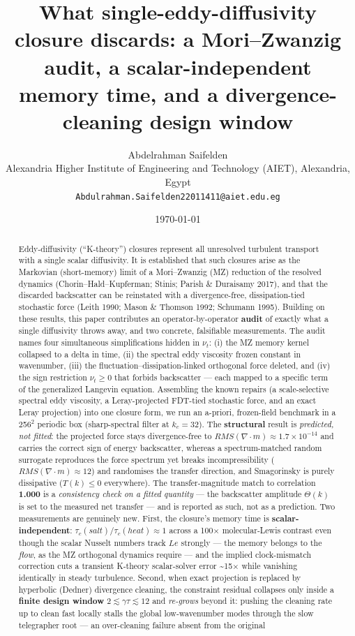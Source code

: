 \documentclass[11pt]{article}
\title{What single-eddy-diffusivity closure discards: a Mori–Zwanzig audit, a scalar-independent memory time, and a divergence-cleaning design window}
\author{Abdelrahman Saifelden\\ Alexandria Higher Institute of Engineering and Technology (AIET), Alexandria, Egypt\\ \texttt{Abdulrahman.Saifelden22011411@aiet.edu.eg}}
\date{\today}
\begin{document}
\maketitle

\begin{abstract}


Eddy-diffusivity (``K-theory'') closures represent all unresolved turbulent transport with a single scalar diffusivity. It is established that such closures arise as the Markovian (short-memory) limit of a Mori–Zwanzig (MZ) reduction of the resolved dynamics (Chorin–Hald–Kupferman; Stinis; Parish \& Duraisamy 2017), and that the discarded backscatter can be reinstated with a divergence-free, dissipation-tied stochastic force (Leith 1990; Mason \& Thomson 1992; Schumann 1995). Building on these results, this paper contributes an operator-by-operator \textbf{audit} of exactly what a single diffusivity throws away, and two concrete, falsifiable measurements. The audit names four simultaneous simplifications hidden in $\nu _{t}$: (i) the MZ memory kernel collapsed to a delta in time, (ii) the spectral eddy viscosity frozen constant in wavenumber, (iii) the fluctuation–dissipation-linked orthogonal force deleted, and (iv) the sign restriction $\nu _{t}\ge 0$ that forbids backscatter — each mapped to a specific term of the generalized Langevin equation. Assembling the known repairs (a scale-selective spectral eddy viscosity, a Leray-projected FDT-tied stochastic force, and an exact Leray projection) into one closure form, we run an a-priori, frozen-field benchmark in a 256\ensuremath{^{2}} periodic box (sharp-spectral filter at $k_{c}=32$). The \textbf{structural} result is \emph{predicted, not fitted}: the projected force stays divergence-free to $RMS(\nabla \cdot m)\approx 1.7\times 10^{-14}$ and carries the correct sign of energy backscatter, whereas a spectrum-matched random surrogate reproduces the force spectrum yet breaks incompressibility ($RMS(\nabla \cdot m)\approx 12$) and randomises the transfer direction, and Smagorinsky is purely dissipative ($T(k)\le 0$ everywhere). The transfer-magnitude match to correlation \textbf{1.000} is a \emph{consistency check on a fitted quantity} — the backscatter amplitude $\Theta (k)$ is set to the measured net transfer — and is reported as such, not as a prediction. Two measurements are genuinely new. First, the closure's memory time is \textbf{scalar-independent}: $\tau _{c}(salt)/\tau _{c}(heat)\approx 1$ across a 100\ensuremath{\times} molecular-Lewis contrast even though the scalar Nusselt numbers track $Le$ strongly — the memory belongs to the \emph{flow}, as the MZ orthogonal dynamics require — and the implied clock-mismatch correction cuts a transient K-theory scalar-solver error \textasciitilde{}15\ensuremath{\times} while vanishing identically in steady turbulence. Second, when exact projection is replaced by hyperbolic (Dedner) divergence cleaning, the constraint residual collapses only inside a \textbf{finite design window} $2\lesssim \gamma \tau \lesssim 12$ and \emph{re-grows} beyond it: pushing the cleaning rate up to clean fast locally stalls the global low-wavenumber modes through the slow telegrapher root — an over-cleaning failure absent from the original 
\end{abstract}
\end{document}
